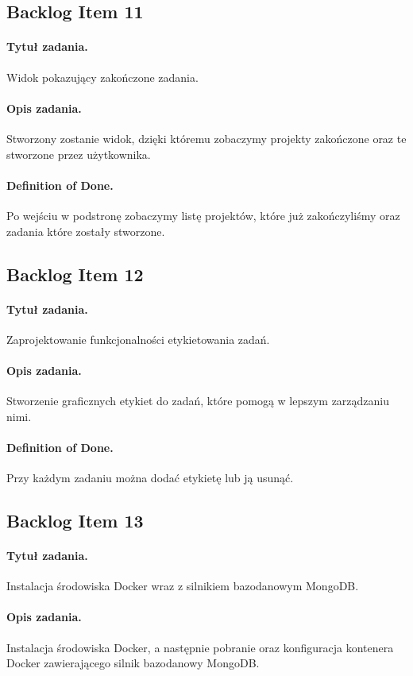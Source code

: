 ﻿\documentclass[a4paper]{article}
\begin{document}
\subsection{Backlog Item 11} 
\paragraph{Tytuł zadania.} Widok pokazujący zakończone zadania.
\paragraph{Opis zadania.} Stworzony zostanie widok, dzięki któremu zobaczymy projekty zakończone oraz te stworzone przez użytkownika.
\paragraph{Definition of Done.} Po wejściu w podstronę zobaczymy listę projektów, które już zakończyliśmy oraz zadania które zostały stworzone.

\subsection{Backlog Item 12} 
\paragraph{Tytuł zadania.} Zaprojektowanie funkcjonalności etykietowania zadań.
\paragraph{Opis zadania.} Stworzenie graficznych etykiet do zadań, które pomogą w lepszym zarządzaniu nimi.
\paragraph{Definition of Done.} Przy każdym zadaniu można dodać etykietę lub ją usunąć.



\subsection{Backlog Item 13} 
\paragraph{Tytuł zadania.}  Instalacja środowiska Docker wraz z silnikiem bazodanowym MongoDB.
\paragraph{Opis zadania.} Instalacja środowiska Docker, a następnie pobranie oraz konfiguracja kontenera Docker zawierającego silnik bazodanowy MongoDB.
\end{document}
